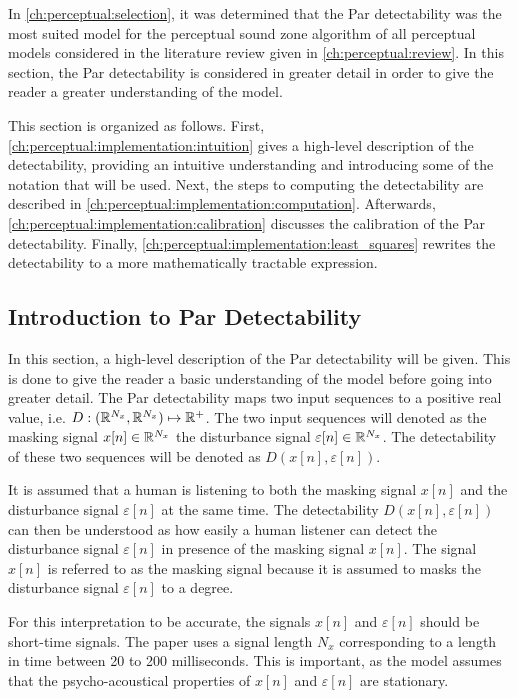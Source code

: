 In \autoref{ch:perceptual:selection}, it was determined that the Par detectability was the 
most suited model for the perceptual sound zone algorithm of all perceptual models considered in 
the literature review given in \autoref{ch:perceptual:review}.
In this section, the Par detectability is considered in greater detail in order to give the reader a greater
understanding of the model.

This section is organized as follows.
First, \autoref{ch:perceptual:implementation:intuition} gives a high-level description of the detectability, providing 
an intuitive understanding and introducing some of the notation that will be used.
Next, the steps to computing the detectability are described in \autoref{ch:perceptual:implementation:computation}.
Afterwards, \autoref{ch:perceptual:implementation:calibration} discusses the calibration of the Par detectability.
Finally, \autoref{ch:perceptual:implementation:least_squares} rewrites the detectability to a more mathematically tractable expression.

\subsection{Introduction to Par Detectability}
\label{ch:perceptual:implementation:intuition}
In this section, a high-level description of the Par detectability will be given.
This is done to give the reader a basic understanding of the model before going into greater detail.
The Par detectability maps two input sequences to a positive real value, i.e. $D: (\mathbb{R}^{N_x}, \mathbb{R}^{N_x})\mapsto \mathbb{R}^{+}$.
The two input sequences will denoted as the masking signal $x[n]\in\mathbb{R}^{N_x}$ the disturbance signal $\varepsilon[n]\in\mathbb{R}^{N_x}$.
The detectability of these two sequences will be denoted as $D(x[n], \varepsilon[n])$. 

It is assumed that a human is listening to both the masking signal $x[n]$ and the disturbance signal $\varepsilon[n]$ at the same time.
The detectability $D(x[n], \varepsilon[n])$ can then be understood as how easily a human listener can detect the disturbance signal 
$\varepsilon[n]$ in presence of the masking signal $x[n]$.
The signal $x[n]$ is referred to as the masking signal because it is assumed to masks the disturbance signal 
$\varepsilon[n]$ to a degree.

For this interpretation to be accurate, the signals $x[n]$ and $\varepsilon[n]$ should be short-time signals.
The paper uses a signal length $N_x$ corresponding to a length in time between 20 to 200 milliseconds.    
This is important, as the model assumes that the psycho-acoustical properties of $x[n]$ 
and $\varepsilon[n]$ are stationary.  

